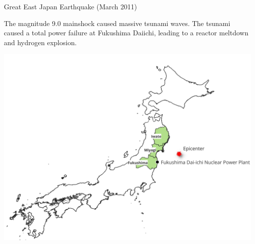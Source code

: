 \documentclass[serif, aspectratio=169]{beamer}
\begin{document}
\begin{frame}{Great East Japan Earthquake (March 2011)}
    \begin{minipage}{1.00\textwidth}

    \raggedright %
    \begin{flushleft}
\begin{table}[h!]
\vspace{-1.0cm} %
\raggedright
The magnitude 9.0 mainshock caused massive tsunami waves. The tsunami caused a total power failure at Fukushima Daiichi, leading to a reactor meltdown and hydrogen explosion.
\vspace{-0.12cm} %
  \label{table:disaster_situation}
  \begin{minipage}[c]{0.4\textwidth}
    \includegraphics[width=\textwidth,height=1.10\textwidth]{epicenter.jpeg}
  \end{minipage}
  \begin{minipage}[c]{0.51\textwidth}
    \raggedright
  \end{minipage}
  

\end{table}
\end{flushleft}
\end{minipage}
\end{frame}
\end{document}
